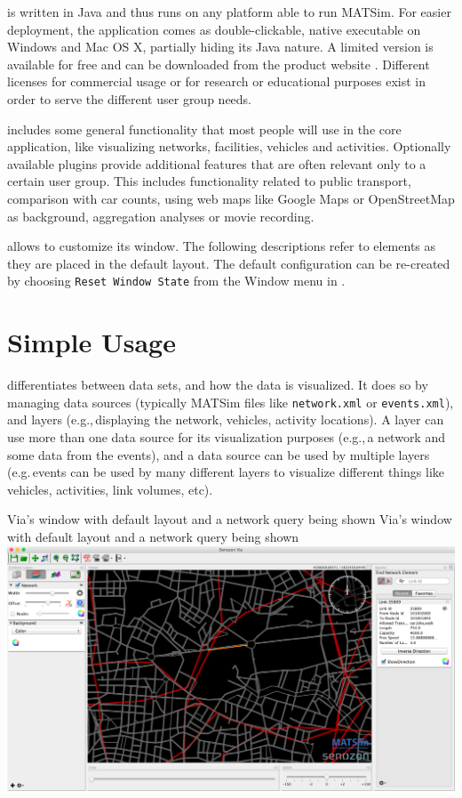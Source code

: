 \Via{} is written in Java and thus runs on any platform able to run
MATSim. For easier deployment, the application comes as double-clickable, native
executable on Windows and Mac OS X, partially hiding its Java nature. A
limited version is available for free and can be downloaded from the product
website \citep[][]{senozonVIA_Webpage_2015}. 
Different licenses for commercial usage or for research or educational purposes
exist in order to serve the different user group needs.

\Via{} includes some general functionality that most people will use in the core
application, like visualizing networks, facilities, vehicles and activities.
Optionally available plugins provide additional features that are
often relevant only to a certain user group. This includes functionality related
to public transport, comparison with car counts, using web maps like Google Maps
or OpenStreetMap as background, aggregation analyses or movie recording.

\Via{} allows to customize its window. The following descriptions refer to
elements as they are placed in the default layout. The default configuration can
be re-created by choosing \lstinline|Reset Window State| from the Window menu in \Via{}.

\section{Simple Usage}
\Via{} differentiates between data sets, and how the data is visualized. It
does so by managing data sources (typically MATSim files like \lstinline|network.xml|
or \lstinline|events.xml|), and layers (e.g.,\,displaying the network, vehicles,
activity locations). A layer can use more than one data source for its
visualization purposes (e.g.,\,a network and some data from the events), and a
data source can be used by multiple layers (e.g.\,events can be used by many
different layers to visualize different things like vehicles, activities, link
volumes, etc).

\createfigure%
{Via's window with default layout and a network query being shown}%
{Via's window with default layout and a network query being shown}%
{\label{fig:via:window}}%
{\includegraphics[width=1.\textwidth,angle=0]{./extending/figures/via/window.png}}%
{}

